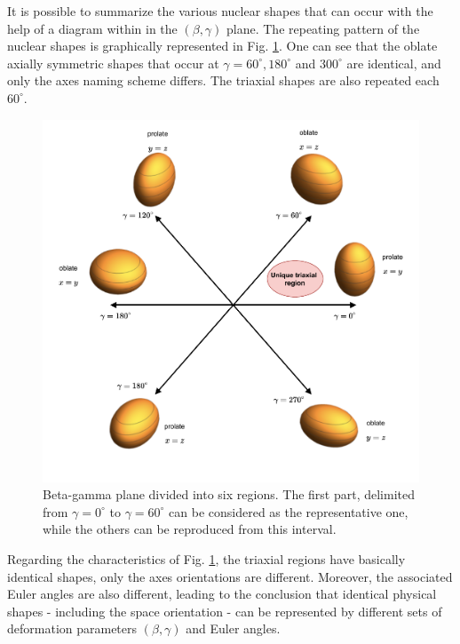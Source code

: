 It is possible to summarize the various nuclear shapes that can occur with the help of a diagram within in the $(\beta,\gamma)$ plane. The repeating pattern of the nuclear shapes is graphically represented in Fig. \ref{beta-gamma-plane}. One can see that the oblate axially symmetric shapes that occur at $\gamma=60^\circ,180^\circ$ and $300^\circ$ are identical, and only the axes naming scheme differs. The triaxial shapes are also repeated each $60^\circ$.

\begin{figure}
    \centering
    \includegraphics[scale=0.65]{Chapters/Figures/beta_gamma_plane.pdf}
    \caption{Beta-gamma plane divided into six regions. The first part, delimited from $\gamma=0^\circ$ to $\gamma=60^\circ$ can be considered as the representative one, while the others can be reproduced from this interval.}
    \label{beta-gamma-plane}
\end{figure}

Regarding the characteristics of Fig. \ref{beta-gamma-plane}, the triaxial regions have basically identical shapes, only the axes orientations are different. Moreover, the associated Euler angles are also different, leading to the conclusion that identical physical shapes - including the space orientation - can be represented by different sets of deformation parameters $(\beta,\gamma)$ and Euler angles.

